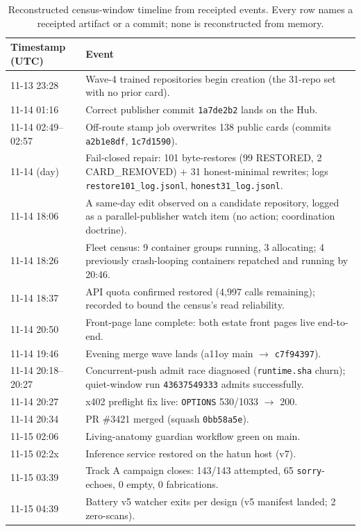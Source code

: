 ﻿\documentclass[11pt]{article}
\begin{document}
\begin{table}[htbp]
\centering
\small
\begin{tabular}{lp{9.6cm}}
\toprule
\textbf{Timestamp (UTC)} & \textbf{Event} \\
\midrule
11-13 23:28 & Wave-4 trained repositories begin creation (the 31-repo set with no prior card). \\
11-14 01:16 & Correct publisher commit \texttt{1a7de2b2} lands on the Hub. \\
11-14 02:49--02:57 & Off-route stamp job overwrites 138 public cards (commits \texttt{a2b1e8df}, \texttt{1c7d1590}). \\
11-14 (day) & Fail-closed repair: 101 byte-restores (99 RESTORED, 2 CARD\_REMOVED) + 31 honest-minimal rewrites; logs \texttt{restore101\_log.jsonl}, \texttt{honest31\_log.jsonl}. \\
11-14 18:06 & A same-day edit observed on a candidate repository, logged as a parallel-publisher watch item (no action; coordination doctrine). \\
11-14 18:26 & Fleet census: 9 container groups running, 3 allocating; 4 previously crash-looping containers repatched and running by 20:46. \\
11-14 18:37 & API quota confirmed restored (4,997 calls remaining); recorded to bound the census's read reliability. \\
11-14 20:50 & Front-page lane complete: both estate front pages live end-to-end. \\
11-14 19:46 & Evening merge wave lands (a11oy main $\to$ \texttt{c7f94397}). \\
11-14 20:18--20:27 & Concurrent-push admit race diagnosed (\texttt{runtime.sha} churn); quiet-window run \texttt{43637549333} admits successfully. \\
11-14 20:27 & x402 preflight fix live: \texttt{OPTIONS} 530/1033 $\to$ 200. \\
11-14 20:34 & PR \#3421 merged (squash \texttt{0bb58a5e}). \\
11-15 02:06 & Living-anatomy guardian workflow green on main. \\
11-15 02:2x & Inference service restored on the hatun host (v7). \\
11-15 03:39 & Track A campaign closes: 143/143 attempted, 65 \texttt{sorry}-echoes, 0 empty, 0 fabrications. \\
11-15 04:39 & Battery v5 watcher exits per design (v5 manifest landed; 2 zero-scans). \\
\bottomrule
\end{tabular}
\caption{Reconstructed census-window timeline from receipted events. Every row names a receipted artifact or a commit; none is reconstructed from memory.}
\label{tab:timeline}
\end{table}
\end{document}
